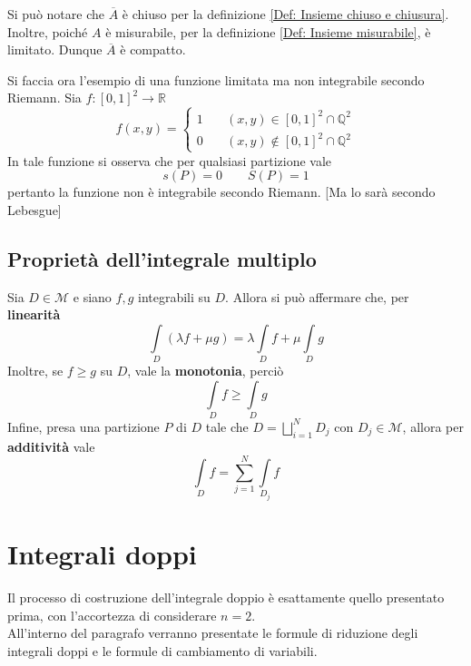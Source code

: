 \begin{oss}
    Si può notare che $\overline{A}$ è chiuso per la definizione \ref{Def: Insieme chiuso e chiusura}. Inoltre, poiché $A$ è misurabile, per la definizione \ref{Def: Insieme misurabile}, è limitato. Dunque $\overline{A}$ è compatto.
\end{oss}
\begin{example}
    Si faccia ora l'esempio di una funzione limitata ma non integrabile secondo Riemann. Sia $f: [0,1]^2 \to \mathbb{R}$
    \begin{equation*}
    f(x, y)=\begin{cases}
        1 \quad & (x,y) \in [0,1]^2 \cap \mathbb{Q}^2\\
        0 \quad & (x,y) \notin [0,1]^2 \cap \mathbb{Q}^2
    \end{cases}
    \end{equation*}
    In tale funzione si osserva che per qualsiasi partizione vale
    \begin{equation*}
        s(P)=0 \qquad S(P)=1 
    \end{equation*}
    pertanto la funzione non è integrabile secondo Riemann. [Ma lo sarà secondo Lebesgue]
\end{example}
\subsection{Proprietà dell'integrale multiplo}
Sia $D \in \mathcal{M}$ e siano $f, g$ integrabili su $D$.
Allora si può affermare che, per \textbf{linearità}
\begin{equation*}
    \int\limits_D{(\lambda f+ \mu g)}= \lambda \int\limits_D{f}+ \mu \int\limits_D g
\end{equation*}
Inoltre, se $ f \geq g$ su $D$, vale la \textbf{monotonia}, perciò
\begin{equation*}
    \int\limits_D{f} \geq \int\limits_D{g}
\end{equation*}
Infine, presa una partizione $P$ di $D$ tale che $D= \bigsqcup\limits_{i=1}^{N} D_j$ con $D_j \in \mathcal{M}$, allora per \textbf{additività} vale
\begin{equation*}
    \int\limits_D{f}= \sum\limits_{j=1}^{N}{\int\limits_{D_j}{f}}
\end{equation*}
\section{Integrali doppi}
Il processo di costruzione dell'integrale doppio è esattamente quello presentato prima, con l'accortezza di considerare $n=2$.\\
All'interno del paragrafo verranno presentate le formule di riduzione degli integrali doppi e le formule di cambiamento di variabili.
